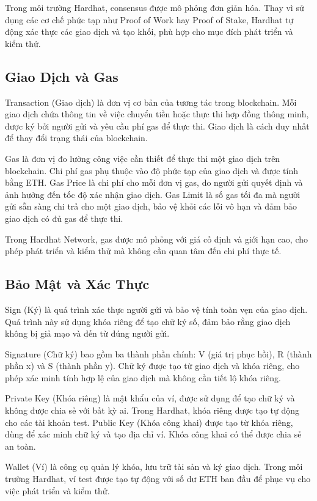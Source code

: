 Trong môi trường Hardhat, consensus được mô phỏng đơn giản hóa. Thay vì sử dụng các cơ chế phức tạp như Proof of Work hay Proof of Stake, Hardhat tự động xác thực các giao dịch và tạo khối, phù hợp cho mục đích phát triển và kiểm thử.

\subsection{Giao Dịch và Gas}
Transaction (Giao dịch) là đơn vị cơ bản của tương tác trong blockchain. Mỗi giao dịch chứa thông tin về việc chuyển tiền hoặc thực thi hợp đồng thông minh, được ký bởi người gửi và yêu cầu phí gas để thực thi. Giao dịch là cách duy nhất để thay đổi trạng thái của blockchain.

Gas là đơn vị đo lường công việc cần thiết để thực thi một giao dịch trên blockchain. Chi phí gas phụ thuộc vào độ phức tạp của giao dịch và được tính bằng ETH. Gas Price là chi phí cho mỗi đơn vị gas, do người gửi quyết định và ảnh hưởng đến tốc độ xác nhận giao dịch. Gas Limit là số gas tối đa mà người gửi sẵn sàng chi trả cho một giao dịch, bảo vệ khỏi các lỗi vô hạn và đảm bảo giao dịch có đủ gas để thực thi.

Trong Hardhat Network, gas được mô phỏng với giá cố định và giới hạn cao, cho phép phát triển và kiểm thử mà không cần quan tâm đến chi phí thực tế.

\subsection{Bảo Mật và Xác Thực}
Sign (Ký) là quá trình xác thực người gửi và bảo vệ tính toàn vẹn của giao dịch. Quá trình này sử dụng khóa riêng để tạo chữ ký số, đảm bảo rằng giao dịch không bị giả mạo và đến từ đúng người gửi.

Signature (Chữ ký) bao gồm ba thành phần chính: V (giá trị phục hồi), R (thành phần x) và S (thành phần y). Chữ ký được tạo từ giao dịch và khóa riêng, cho phép xác minh tính hợp lệ của giao dịch mà không cần tiết lộ khóa riêng.

Private Key (Khóa riêng) là mật khẩu của ví, được sử dụng để tạo chữ ký và không được chia sẻ với bất kỳ ai. Trong Hardhat, khóa riêng được tạo tự động cho các tài khoản test. Public Key (Khóa công khai) được tạo từ khóa riêng, dùng để xác minh chữ ký và tạo địa chỉ ví. Khóa công khai có thể được chia sẻ an toàn.

Wallet (Ví) là công cụ quản lý khóa, lưu trữ tài sản và ký giao dịch. Trong môi trường Hardhat, ví test được tạo tự động với số dư ETH ban đầu để phục vụ cho việc phát triển và kiểm thử.

